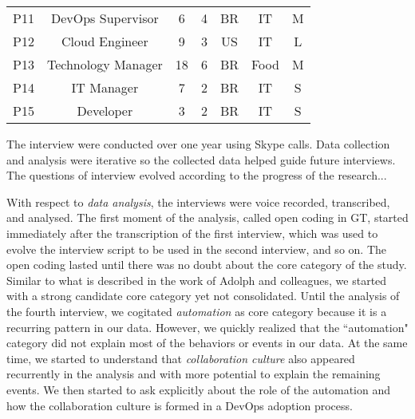 \begin{table}[t]
\begin{tabular}{ccccccc}
P11                  & DevOps Supervisor                & 6            & 4           & BR            & IT                  & M                               \\

P12                  & Cloud Engineer              & 9            & 3           & US            & IT                  & L                               \\

P13                  & Technology Manager                 & 18            & 6           & BR            & Food                  & M                               \\

P14                  & IT Manager            & 7            & 2           & BR            & IT                  & S                               \\

P15                  & Developer        & 3            & 2           & BR            & IT                  & S
\end{tabular}
\end{table}



The interview were conducted over one year using Skype calls.
Data collection and analysis were iterative so the collected data helped guide
future interviews. {\color{red}The questions of interview evolved according to the progress
of the research...} 

With respect to \emph{data analysis}, the interviews were voice recorded, transcribed, and analysed. The first moment
of the analysis, called open coding in GT, started immediately after the
transcription of the first interview, which 
was used to evolve the interview script to be used in
the second interview, and so on. The open coding lasted until there was no
doubt about the core category of the study. Similar to what is described in
the work of Adolph and colleagues\cite{adolph2012reconciling}, we started
with a strong candidate core category yet not consolidated. Until
the analysis of the fourth interview, we cogitated \emph{automation} as core
category because it is a recurring pattern in our data. However, we quickly
realized that the ``automation" category did not explain most of the behaviors
or events in our data. At the same time, we started to understand that 
\emph{collaboration culture} also appeared recurrently in the analysis and with more
potential to explain the remaining events. We then started to ask explicitly
about the role of the automation and how the collaboration culture is formed
in a DevOps adoption process.

